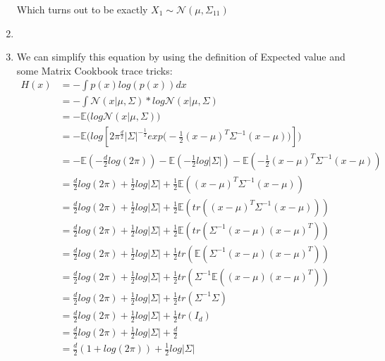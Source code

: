 \documentclass[11pt,a4paper]{article}
\begin{document}
\begin{enumerate}
			Which turns out to be exactly $X_1 \mathtt{\sim} \mathcal{N}(\mu, \Sigma_{11})$
			\item
			\item We can simplify this equation by using the definition of Expected value and some Matrix Cookbook trace tricks:
			\begin{align*}
			H(x) &= -\int p(x)log(p(x)) dx \\
			&= -\int \mathcal{N}(x|\mu,\Sigma)*log\mathcal{N}(x|\mu,\Sigma) \\
			&= -\mathbb{E}\Big(log\mathcal{N}(x|\mu,\Sigma)\Big) \\
			&= -\mathbb{E}\Big(log[2\pi^{\frac{d}{2}}|\Sigma|^{-\frac{1}{2}}exp\big(-\frac{1}{2}(x-\mu)^T \Sigma^{-1} (x-\mu)\big)]\Big)\\
			&= -\mathbb{E}(-\frac{d}{2}log(2\pi)) -\mathbb{E}(-\frac{1}{2}log|\Sigma|)-\mathbb{E}(-\frac{1}{2}(x-\mu)^T \Sigma^{-1} (x-\mu)) \\
			&= \frac{d}{2}log(2\pi) + \frac{1}{2}log|\Sigma| + \frac{1}{2}\mathbb{E}((x-\mu)^T \Sigma^{-1} (x-\mu)) \\
			&= \frac{d}{2}log(2\pi) + \frac{1}{2}log|\Sigma| + \frac{1}{2}\mathbb{E}(tr((x-\mu)^T \Sigma^{-1} (x-\mu))) \\
			&= \frac{d}{2}log(2\pi) + \frac{1}{2}log|\Sigma| + \frac{1}{2}\mathbb{E}(tr(\Sigma^{-1} (x-\mu)(x-\mu)^T )) \\
			&= \frac{d}{2}log(2\pi) + \frac{1}{2}log|\Sigma| + \frac{1}{2}tr(\mathbb{E}(\Sigma^{-1} (x-\mu)(x-\mu)^T )) \\
			&= \frac{d}{2}log(2\pi) + \frac{1}{2}log|\Sigma| + \frac{1}{2}tr(\Sigma^{-1}\mathbb{E}( (x-\mu)(x-\mu)^T )) \\
			&= \frac{d}{2}log(2\pi) + \frac{1}{2}log|\Sigma| + \frac{1}{2}tr(\Sigma^{-1}\Sigma) \\
			&= \frac{d}{2}log(2\pi) + \frac{1}{2}log|\Sigma| + \frac{1}{2}tr(I_d) \\
			&= \frac{d}{2}log(2\pi) + \frac{1}{2}log|\Sigma| + \frac{d}{2} \\
			&= \frac{d}{2}(1+log(2\pi)) + \frac{1}{2}log|\Sigma|
\end{align*}						
			

\end{enumerate}
\end{document}
